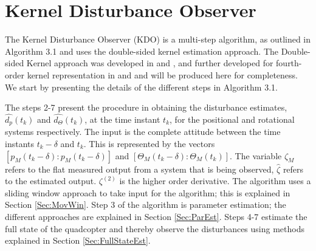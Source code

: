 \documentclass[letterpaper%
, twoside%
, 12pt%
,memoire%
, english%
,creativecommons,hyperref%
]{thETS}
\theoremstyle{newThmStyle}
\begin{document}
\chapter{Kernel Disturbance Observer} \label{Chap:KDO}
The Kernel Disturbance Observer (KDO) is a multi-step algorithm, as outlined in Algorithm 3.1 and uses the double-sided kernel estimation approach. The Double-sided Kernel approach was developed in \citep{RN119} and \citep{RN76}, and further developed for fourth-order kernel representation in \citep{RN83} and \citep{RN120} and will be produced here for completeness. We start by presenting the details of the different steps in Algorithm 3.1. 

The steps 2-7 present the procedure in obtaining the disturbance estimates, $\hat{d_p}(t_k)$ and $\hat{d_\Theta}(t_k)$, at the time instant $t_k$, for the positional and rotational systems respectively. The input is the complete attitude between the time instants $t_k-\delta$ and $t_k$. This is represented by the vectors $[p_M(t_k-\delta) : p_{M}(t_k-\delta)]$ and $[\Theta_M(t_k-\delta) : \Theta_M(t_k)]$. The variable $\zeta_M$ refers to the flat measured output from a system that is being observed, $\hat{\zeta}$ refers to the estimated output. ${\zeta}^{(2)}$ is the higher order derivative. The algorithm uses a sliding window approach to take input for the algorithm; this is explained in Section \ref{Sec:MovWin}. Step 3 of the algorithm is parameter estimation; the different approaches are explained in Section \ref{Sec:ParEst}. Steps 4-7 estimate the full state of the quadcopter and thereby observe the disturbances using methods explained in Section \ref{Sec:FullStateEst}.
\end{document}
